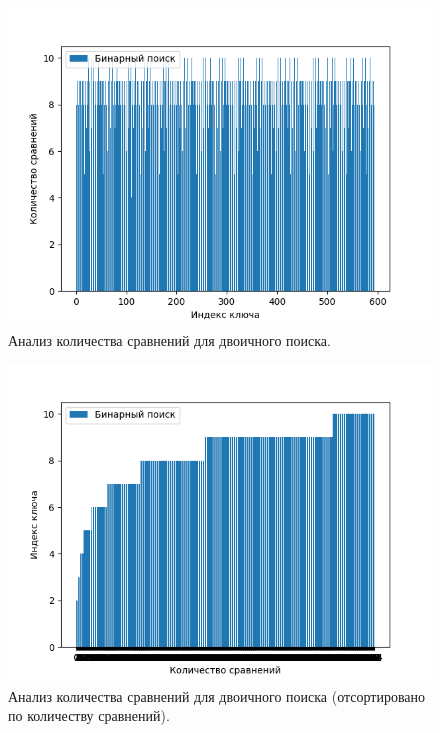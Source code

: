\documentclass[12pt]{report}
\begin{document}
\begin{figure}[H]
	\centering
	\includegraphics[scale=0.7]{bin_search.png}
	\caption{Анализ количества сравнений для двоичного поиска.}
	\label{fig:mpr}

\end{figure}

\begin{figure}[H]
	\centering
	\includegraphics[scale=0.7]{bin_search_sorted.png}
	\caption{Анализ количества сравнений для двоичного поиска (отсортировано по количеству сравнений).}
	\label{fig:mpr}
\end{figure}
\end{document}
